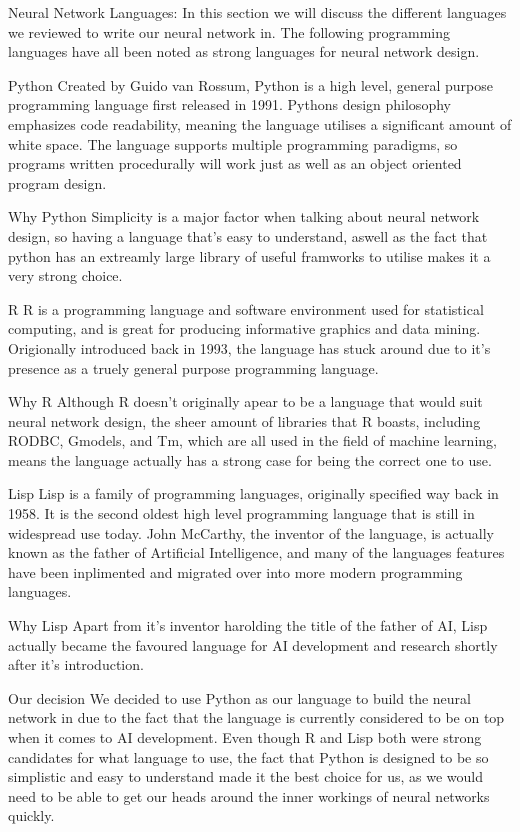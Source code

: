 Neural Network Languages:
In this section we will discuss the different languages we reviewed to write our neural network in. The following programming languages have all been noted as strong languages for neural network design.

Python
Created by Guido van Rossum, Python is a high level, general purpose programming language first released in 1991. Pythons design philosophy emphasizes code readability, meaning the language utilises a significant amount of white space. The language supports multiple programming paradigms, so programs written procedurally will work just as well as an object oriented program design.

Why Python 
Simplicity is a major factor when talking about neural network design, so having a language that's easy to understand, aswell as the fact that python has an extreamly large library of useful framworks to utilise makes it a very strong choice.

R
R is a programming language and software environment used for statistical computing, and is great for producing informative graphics and data mining. Origionally introduced back in 1993, the language has stuck around due to it's presence as a truely general purpose programming language.

Why R
Although R doesn't originally apear to be a language that would suit neural network design, the sheer amount of libraries that R boasts, including RODBC, Gmodels, and Tm, which are all used in the field of machine learning, means the language actually has a strong case for being the correct one to use.

Lisp
Lisp is a family of programming languages, originally specified way back in 1958. It is the second oldest high level programming language that is still in widespread use today. John McCarthy, the inventor of the language, is actually known as the father of Artificial Intelligence, and many of the languages features have been inplimented and migrated over into more modern programming languages.

Why Lisp
Apart from it's inventor harolding the title of the father of AI, Lisp actually became the favoured language for AI development and research shortly after it's introduction.

Our decision
We decided to use Python as our language to build the neural network in due to the fact that the language is currently considered to be on top when it comes to AI development. Even though R and Lisp both were strong candidates for what language to use, the fact that Python is designed to be so simplistic and easy to understand made it the best choice for us, as we would need to be able to get our heads around the inner workings of neural networks quickly.

